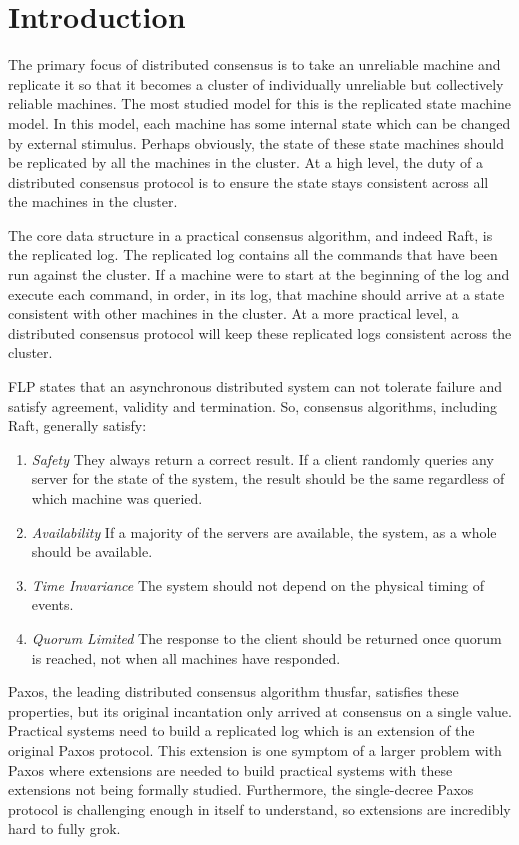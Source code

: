 \section{Introduction}

The primary focus of distributed consensus is to take an unreliable machine and replicate it so that it becomes a cluster of individually unreliable but collectively reliable machines.
The most studied model for this is the replicated state machine model.
In this model, each machine has some internal state which can be changed by external stimulus.
Perhaps obviously, the state of these state machines should be replicated by all the machines in the cluster.
At a high level, the duty of a distributed consensus protocol is to ensure the state stays consistent across all the machines in the cluster.

The core data structure in a practical consensus algorithm, and indeed Raft, is the replicated log.
The replicated log contains all the commands that have been run against the cluster.
If a machine were to start at the beginning of the log and execute each command, in order, in its log, that machine should arrive at a state consistent with other machines in the cluster.
At a more practical level, a distributed consensus protocol will keep these replicated logs consistent across the cluster.

FLP states that an asynchronous distributed system can not tolerate failure and satisfy agreement, validity and termination. \cite{flp-theorem}
So, consensus algorithms, including Raft, generally satisfy:
\begin{enumerate}
    \item \textit{Safety} They always return a correct result.
    If a client randomly queries any server for the state of the system, the result should be the same regardless of which machine was queried.
    \item \textit{Availability} If a majority of the servers are available, the system, as a whole should be available.
    \item \textit{Time Invariance} The system should not depend on the physical timing of events.
    \item \textit{Quorum Limited} The response to the client should be returned once quorum is reached, not when all machines have responded.
\end{enumerate}

Paxos, the leading distributed consensus algorithm thusfar, satisfies these properties, but its original incantation only arrived at consensus on a single value. \cite{long-form-paxos}
Practical systems need to build a replicated log which is an extension of the original Paxos protocol.
This extension is one symptom of a larger problem with Paxos where extensions are needed to build practical systems with these extensions not being formally studied.
Furthermore, the single-decree Paxos protocol is challenging enough in itself to understand, so extensions are incredibly hard to fully grok.

